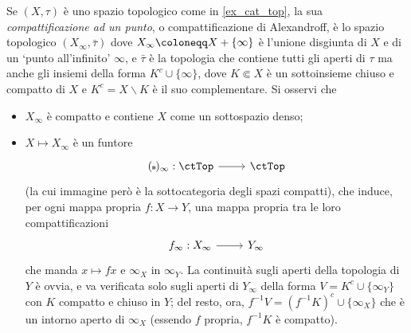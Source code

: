 \begin{example}
	Se \((X,\tau)\) è uno spazio topologico come in \ref{ex_cat_top}, la sua \emph{compattificazione ad un punto}, o compattificazione di Alexandroff, è lo spazio topologico \((X_\infty,\bar\tau)\) dove \(X_\infty \defeq X + \{\infty\}\) è l'unione disgiunta di \(X\) e di un `punto all'infinito' \(\infty\), e \(\bar\tau\) è la topologia che contiene tutti gli aperti di \(\tau\) ma anche gli insiemi della forma \(K^c \cup \{\infty\}\), dove \(K\Subset X\) è un sottoinsieme chiuso e compatto di \(X\) e \(K^c = X\smallsetminus K\) è il suo complementare. Si osservi che
	\begin{itemize}
		\item \(X_\infty\) è compatto e contiene \(X\) come un sottospazio denso;
		\item \(X\mapsto X_\infty\) è un funtore
		      \[\dmFun{(\blank)_\infty}\ctTop\ctTop\]
		      (la cui immagine però è la sottocategoria degli spazi compatti), che induce, per ogni mappa propria \(f : X\to Y\), una mappa propria tra le loro compattificazioni
		      \[\begin{tikzcd}
				      f_\infty : X_\infty \ar[r] & Y_\infty
			      \end{tikzcd}\]
		      che manda \(x\mapsto fx\) e \(\infty_X\) in \(\infty_Y\). La continuità sugli aperti della topologia di \(Y\) è ovvia, e va verificata solo sugli aperti di \(Y_\infty\) della forma \(V=K^c\cup\{\infty_Y\}\) con \(K\) compatto e chiuso in \(Y\); del resto, ora, \(f^{-1}V = (f^{-1}K)^c \cup \{\infty_X\}\) che è un intorno aperto di \(\infty_X\) (essendo \(f\) propria, \(f^{-1}K\) è compatto).
	\end{itemize}
\end{example}
